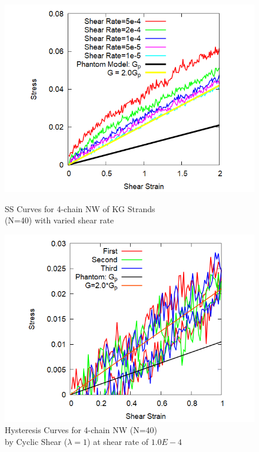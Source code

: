 \documentclass[uplatex,dvipdfmx,a4paper,12pt]{article}
\begin{document}
\begin{figure}[hb]
    \begin{minipage}{0.5\hsize}
        \begin{center}
            \includegraphics[width=.9\textwidth]{4chain_N40_shear.png}
            \vspace{2mm}
            \caption{SS Curves for 4-chain NW of KG Strands \\(N=40) with varied shear rate}
        \label{fig:deform}
        \end{center}
    \end{minipage}
    \begin{minipage}{0.5\hsize}
        \begin{center}
            \includegraphics[width=.9\textwidth]{N40_rate1e-4.png}
            \vspace{2mm}
            \caption{Hysteresis Curves for 4-chain NW (N=40) \\by Cyclic Shear ($\lambda = 1$) at shear rate of $1.0E-4$}
        \label{fig:hyst}
        \end{center}
    \end{minipage}
\end{figure}
\end{document}
